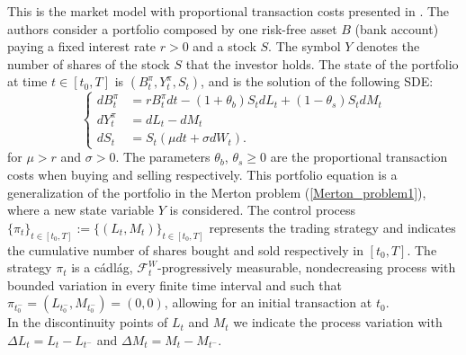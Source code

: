 This is the market model with proportional transaction costs presented in \cite{DaPaZa93}. 
The authors consider a portfolio composed by one risk-free asset $B$ (bank account) paying a fixed interest rate $r > 0$ and a stock $S$. 
The symbol $Y$ denotes the number of shares of the stock $S$ that the investor holds. 
The state of the portfolio at time $t\in [t_0,T]$ is $(B^{\pi}_t,Y^{\pi}_t,S_t)$, and is the solution of the following SDE:
\begin{equation}\label{DPZ_porfolio_dynamics}
 \begin{cases}
 dB^{\pi}_t &=  rB^{\pi}_t dt - (1+\theta_b)S_t dL_t + (1-\theta_s) S_t dM_t \\
 dY^{\pi}_t &=  dL_t - dM_t \\
 dS_t &=  S_t \left( \mu dt + \sigma dW_t \right).
\end{cases}
\end{equation} 
for $\mu>r$ and $\sigma>0$.
The parameters $\theta_b$, $\theta_s \geq 0$ are the proportional transaction costs when buying and selling respectively.
This portfolio equation is a generalization of the portfolio in the Merton problem (\ref{Merton_problem1}), 
where a new state variable $Y$ is considered.
The control process $\{\pi_t\}_{t \in [t_0,T]} := \{(L_t,M_t)\}_{t \in [t_0,T]}$ represents the trading strategy and indicates the 
cumulative number of shares bought and sold respectively in $[t_0,T]$.
The strategy $\pi_t$ is a cádlág, $\mathcal{F}^W_t$-progressively measurable, nondecreasing process with bounded variation in every finite time interval and such that
$ \pi_{t_0^-} = ( L_{t_0^-} , M_{t_0^-} ) = (0,0) $, allowing for an initial transaction at $t_0$.\\
In the discontinuity points of $L_t$ and $M_t$ we indicate the process variation with $\Delta L_t= L_{t}-L_{t^-}$ and $\Delta M_t= M_{t}-M_{t^-}$.



